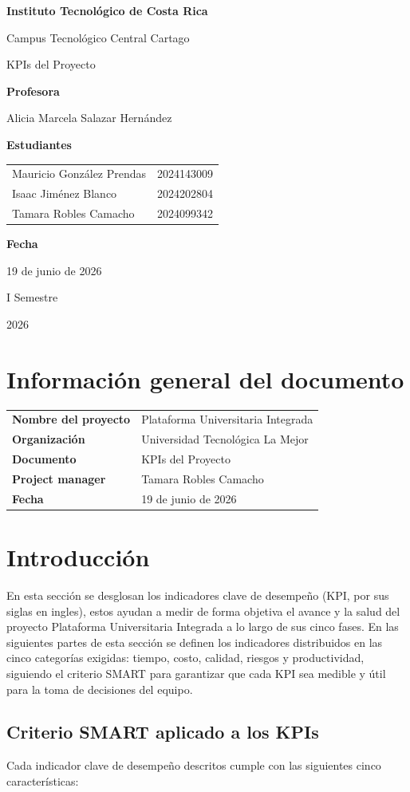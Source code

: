 \documentclass[11pt,spanish]{article}
\title{\DocumentoTitulo}
\author{\AutoresPortada}
\date{\FechaDocumento}
\makeatletter
\newcommand{\Institucion}{Instituto Tecnológico de Costa Rica}
\newcommand{\Campus}{Campus Tecnológico Central Cartago}
\newcommand{\DocumentoTitulo}{KPIs del Proyecto}
\newcommand{\Profesor}{Alicia Marcela Salazar Hernández}
\newcommand{\FechaDocumento}{19 de junio de 2026}
\newcommand{\PeriodoAcademico}{I Semestre}
\newcommand{\AnioDocumento}{2026}
\newcommand{\AutoresPortada}{%
    \begin{tabular}{l@{\hspace{1.5cm}}r}
        Mauricio González Prendas & 2024143009\\
        Isaac Jiménez Blanco & 2024202804\\
        Tamara Robles Camacho & 2024099342
    \end{tabular}%
}
\newcommand{\MakeCover}{%
\begin{titlepage}
\thispagestyle{empty}
\centering

{\bfseries \huge \Institucion \par}
\vspace{0.25cm}
{\LARGE \Campus \par}

\vfill

{\huge \DocumentoTitulo \par}

\vfill

{\bfseries \LARGE Profesora \par}
{\Large \Profesor \par}

\vfill

{\bfseries \LARGE Estudiantes \par}
{\Large \AutoresPortada \par}

\vfill

{\bfseries\LARGE Fecha \par}
{\Large \FechaDocumento \par}

\vfill

{\LARGE \PeriodoAcademico \par}
{\LARGE \AnioDocumento \par}

\end{titlepage}%
}
\makeatother
\begin{document}
\hypersetup{pageanchor=false}

\MakeCover

\pagestyle{empty}
\tableofcontents
\clearpage
{}
\hypersetup{pageanchor=true}
\pagestyle{fancy}

\section{Información general del documento}

\begin{table}[H]
\centering
\begin{tabularx}{\textwidth}{p{5cm} Y}
\toprule
\textbf{Nombre del proyecto} & Plataforma Universitaria Integrada \\
\textbf{Organización} & Universidad Tecnológica La Mejor \\
\textbf{Documento} & \DocumentoTitulo \\
\textbf{Project manager} & Tamara Robles Camacho \\
\textbf{Fecha} & \FechaDocumento \\
\bottomrule
\end{tabularx}
\end{table}

\section{Introducción}

En esta sección se desglosan los indicadores clave de desempeño (KPI, por sus siglas en ingles), estos ayudan a medir de forma objetiva el avance y la salud del proyecto Plataforma Universitaria Integrada a lo largo de sus cinco fases. En las siguientes partes de esta sección se definen los indicadores distribuidos en las cinco categorías exigidas: tiempo, costo, calidad, riesgos y productividad, siguiendo el criterio SMART para garantizar que cada KPI sea medible y útil para la toma de decisiones del equipo.

\subsection{Criterio SMART aplicado a los KPIs}

Cada indicador clave de desempeño descritos cumple con las siguientes cinco características:
\end{document}
